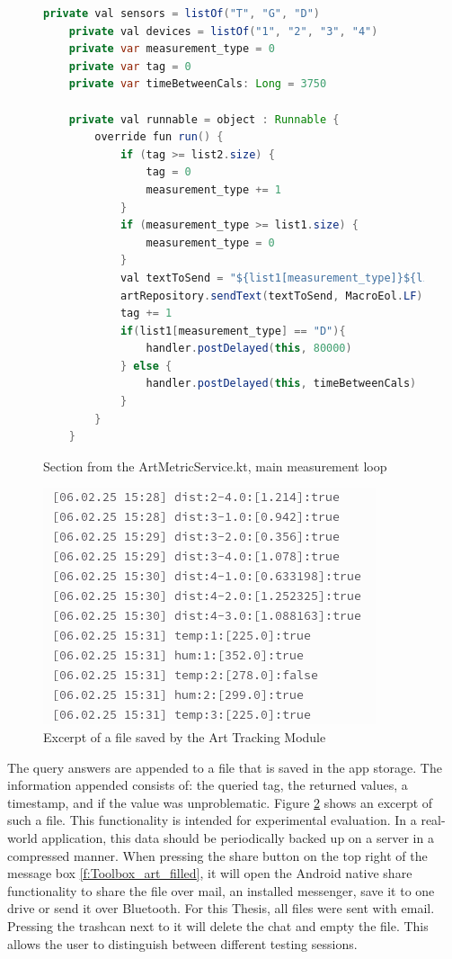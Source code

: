 \begin{figure}[h]
    \centering
    \begin{lstlisting}[language=Java]
    private val sensors = listOf("T", "G", "D")
    private val devices = listOf("1", "2", "3", "4")
    private var measurement_type = 0
    private var tag = 0
    private var timeBetweenCals: Long = 3750

    private val runnable = object : Runnable {
        override fun run() {
            if (tag >= list2.size) {
                tag = 0
                measurement_type += 1
            }
            if (measurement_type >= list1.size) {
                measurement_type = 0
            }
            val textToSend = "${list1[measurement_type]}${list2[tag]}"
            artRepository.sendText(textToSend, MacroEol.LF)
            tag += 1
            if(list1[measurement_type] == "D"){
                handler.postDelayed(this, 80000)
            } else {
                handler.postDelayed(this, timeBetweenCals)
            }
        }
    }
    \end{lstlisting}
    \caption{Section from the ArtMetricService.kt, main measurement loop}
	\label{code:App_main_loop}
\end{figure}


\begin{figure}[ht!]
	\centering
	\includegraphics[width=.4\linewidth]{graphics/measurements_text.png}
	\caption{Excerpt of a file saved by the Art Tracking Module}
	\label{f:data_file}
\end{figure}


The query answers are appended to a file that is saved in the app storage.
The information appended consists of: the queried tag, the returned values, a timestamp, and if the value was unproblematic.
Figure \ref{f:data_file} shows an excerpt of such a file.
This functionality is intended for experimental evaluation. 
In a real-world application, this data should be periodically backed up on a server in a compressed manner.
When pressing the share button on the top right of the message box \ref{f:Toolbox_art_filled}, it will open the Android native share functionality to share the file over mail, an installed messenger, save it to one drive or send it over Bluetooth.
For this Thesis, all files were sent with email.
Pressing the trashcan next to it will delete the chat and empty the file.
This allows the user to distinguish between different testing sessions.


